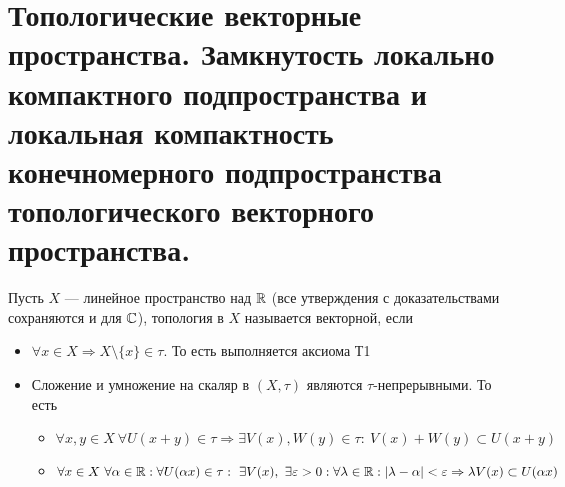\newpage
\section{Топологические векторные пространства. Замкнутость локально компактного подпространства и локальная компактность конечномерного подпространства топологического векторного пространства.}

\begin{definition}
	Пусть $X$ --- линейное пространство над $\mathbb{R}$ (все утверждения с доказательствами сохраняются и для $\mathbb{C}$), топология в $X$ называется векторной, если
	\begin{itemize}
		\item $\forall x \in X \Rightarrow X \setminus \{x\} \in \tau$. То есть выполняется аксиома Т1
		\item Сложение и умножение на скаляр в $(X, \tau)$ являются $\tau$-непрерывными. То есть
		\begin{itemize}
			\item $\forall x,y \in X \ \forall U(x + y) \in \tau \Rightarrow \exists V(x), W(y) \in \tau: \ V(x) + W(y) \subset U(x + y)$
			\item $\forall x \in X \ \forall \alpha \in \mathbb{R}:  \forall U(\alpha x) \in \tau: \ \exists V(x), \ \exists \varepsilon > 0: \forall \lambda \in \mathbb{R} : |\lambda - \alpha| < \varepsilon \Rightarrow \lambda V(x) \subset U(\alpha x )$
		\end{itemize}
	\end{itemize}
\end{definition}
